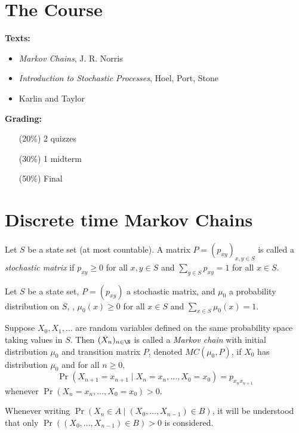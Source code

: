 
\setcounter{chapter}{-1}
\chapter{The Course} \label{sec:course}
\textbf{Texts:} \begin{itemize}
    \item \textit{Markov Chains}, J. R. Norris
    \item \textit{Introduction to Stochastic Processes}, Hoel, Port, Stone
    \item Karlin and Taylor
\end{itemize}

\textbf{Grading:} \begin{itemize}
    \item[(20\%)] 2 quizzes
    \item[(30\%)] 1 midterm
    \item[(50\%)] Final
\end{itemize}

\chapter{Discrete time Markov Chains} \label{sec:dtmc}
\begin{definition} \label{def:stochastic_matrix}
    Let $S$ be a state set (at most countable).
    A matrix $P = (p_{xy})_{x,y \in S}$ is called a \emph{stochastic matrix}
    if $p_{xy} \ge 0$ for all $x, y \in S$ and $\sum_{y \in S} p_{xy} = 1$
    for all $x \in S$.
\end{definition}

\begin{definition} \label{def:markov}
    Let $S$ be a state set, $P = (p_{xy})$ a stochastic matrix, and $\mu_0$
    a probability distribution on $S$, \ie, $\mu_0(x) \ge 0$ for all
    $x \in S$ and $\sum_{x \in S} \mu_0(x) = 1$.

    Suppose $X_0, X_1, \dots$ are random variables defined on the same
    probability space taking values in $S$.
    Then $(X_n)_{n \in \N}$ is called a \emph{Markov chain} with initial
    distribution $\mu_0$ and transition matrix $P$, denoted $MC(\mu_0, P)$,
    if $X_0$ has distribution $\mu_0$ and for all $n \ge 0$, \[
        \Pr(X_{n+1} = x_{n+1} \mid X_n = x_n, \dots, X_0 = x_0)
            = p_{x_n x_{n+1}}
    \] whenever $\Pr(X_n = x_n, \dots, X_0 = x_0) > 0$.
\end{definition}
\begin{notation}
    Whenever writing $\Pr(X_n \in A \mid (X_0, \dots, X_{n-1}) \in B)$, it
    will be understood that only $\Pr((X_0, \dots, X_{n-1}) \in B) > 0$ is
    considered.
\end{notation}

